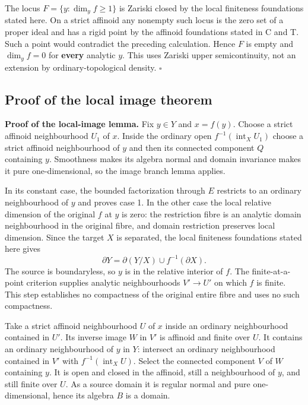 \documentclass[
  10pt,
]{article}
\begin{document}
The locus \(F=\{y:\dim_y f\geq1\}\) is Zariski closed by the local
finiteness foundations stated here. On a strict affinoid any nonempty
such locus is the zero set of a proper ideal and has a rigid point by
the affinoid foundations stated in C and T. Such a point would
contradict the preceding calculation. Hence \(F\) is empty and
\(\dim_y f=0\) for \textbf{every} analytic \(y\). This uses Zariski
upper semicontinuity, not an extension by ordinary-topological density.
\(\square\)

\subsection{Proof of the local image
theorem}\label{proof-of-the-local-image-theorem}

\textbf{Proof of the local-image lemma.} Fix \(y\in Y\) and \(x=f(y)\).
Choose a strict affinoid neighbourhood \(U_1\) of \(x\). Inside the
ordinary open \(f^{-1}(\operatorname{int}_X U_1)\) choose a strict
affinoid neighbourhood of \(y\) and then its connected component \(Q\)
containing \(y\). Smoothness makes its algebra normal and domain
invariance makes it pure one-dimensional, so the image branch lemma
applies.

In its constant case, the bounded factorization through \(E\) restricts
to an ordinary neighbourhood of \(y\) and proves case 1. In the other
case the local relative dimension of the original \(f\) at \(y\) is
zero: the restriction fibre is an analytic domain neighbourhood in the
original fibre, and domain restriction preserves local dimension. Since
the target \(X\) is separated, the local finiteness foundations stated
here gives \[
                    \partial Y
                     =\partial(Y/X)\cup f^{-1}(\partial X).
\] The source is boundaryless, so \(y\) is in the relative interior of
\(f\). The finite-at-a-point criterion supplies analytic neighbourhoods
\(V'\to U'\) on which \(f\) is finite. This step establishes no
compactness of the original entire fibre and uses no such compactness.

Take a strict affinoid neighbourhood \(U\) of \(x\) inside an ordinary
neighbourhood contained in \(U'\). Its inverse image \(W\) in \(V'\) is
affinoid and finite over \(U\). It contains an ordinary neighbourhood of
\(y\) in \(Y\): intersect an ordinary neighbourhood contained in \(V'\)
with \(f^{-1}(\operatorname{int}_X U)\). Select the connected component
\(V\) of \(W\) containing \(y\). It is open and closed in the affinoid,
still a neighbourhood of \(y\), and still finite over \(U\). As a source
domain it is regular normal and pure one-dimensional, hence its algebra
\(B\) is a domain.
\end{document}
